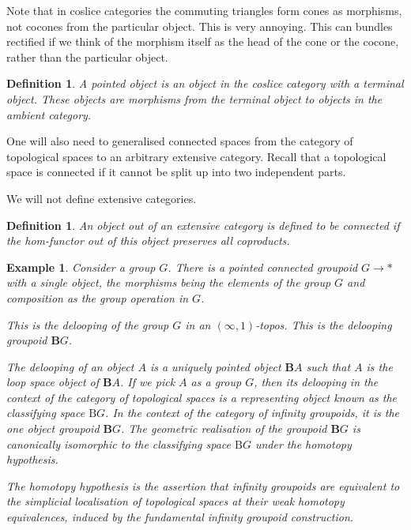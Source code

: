 \documentclass{tufte-book}
\newtheorem{definition}[theorem]{Definition}
\newtheorem{example}[theorem]{Example}
\begin{document}
Note that in coslice categories the commuting triangles form cones as morphisms, not cocones from the particular object. This is very annoying.
This can bundles rectified if we think of the morphism itself as the head of the cone or the cocone, rather than the particular object.

\begin{definition}
	A pointed object is an object in the coslice category with a terminal object. These objects are morphisms from the terminal object to objects in the ambient category.
\end{definition}

One will also need to generalised connected spaces from the category of topological spaces to an arbitrary extensive category. Recall that a topological space is connected if it cannot be split up into two independent parts.

We will not define extensive categories.

\begin{definition}
	An object out of an extensive category is defined to be connected if the hom-functor out of this object preserves all coproducts.
\end{definition}

\begin{example}
	Consider a group $G$. There is a pointed connected groupoid $G \rightarrow *$ with a single object, the morphisms being the elements of the group $G$ and composition as the group operation in $G$.

	This is the delooping of the group $G$ in an $(\infty,1)$-topos. This is the delooping groupoid $\mathbf{B}G$.

	The delooping of an object $A$ is a uniquely pointed object $\mathbf{B}A$ such that $A$ is the loop space object of $\mathbf{B}A$. If we pick $A$ as a group $G$, then its delooping in the context of the category of topological spaces is a representing object known as the classifying space $\mathrm{B}G$. In the context of the category of infinity groupoids, it is the one object groupoid $\mathbf{B}G$. The geometric realisation of the groupoid $\mathbf{B}G$ is canonically isomorphic to the classifying space $\mathrm{B}G$ under the homotopy hypothesis.

	The homotopy hypothesis is the assertion that infinity groupoids are equivalent to the simplicial localisation of topological spaces at their weak homotopy equivalences, induced by the fundamental infinity groupoid construction.
\end{example}
\end{document}
